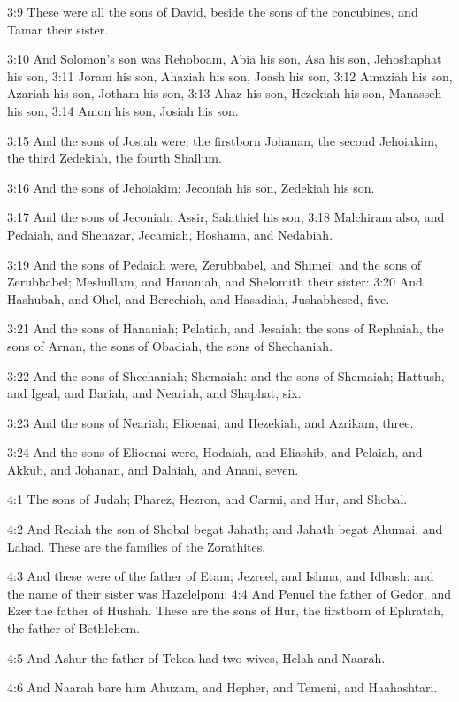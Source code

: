 3:9 These were all the sons of David, beside the sons of the concubines, and Tamar their sister.

3:10 And Solomon's son was Rehoboam, Abia his son, Asa his son, Jehoshaphat his son, 3:11 Joram his son, Ahaziah his son, Joash his son, 3:12 Amaziah his son, Azariah his son, Jotham his son, 3:13 Ahaz his son, Hezekiah his son, Manasseh his son, 3:14 Amon his son, Josiah his son.

3:15 And the sons of Josiah were, the firstborn Johanan, the second Jehoiakim, the third Zedekiah, the fourth Shallum.

3:16 And the sons of Jehoiakim: Jeconiah his son, Zedekiah his son.

3:17 And the sons of Jeconiah; Assir, Salathiel his son, 3:18 Malchiram also, and Pedaiah, and Shenazar, Jecamiah, Hoshama, and Nedabiah.

3:19 And the sons of Pedaiah were, Zerubbabel, and Shimei: and the sons of Zerubbabel; Meshullam, and Hananiah, and Shelomith their sister: 3:20 And Hashubah, and Ohel, and Berechiah, and Hasadiah, Jushabhesed, five.

3:21 And the sons of Hananiah; Pelatiah, and Jesaiah: the sons of Rephaiah, the sons of Arnan, the sons of Obadiah, the sons of Shechaniah.

3:22 And the sons of Shechaniah; Shemaiah: and the sons of Shemaiah; Hattush, and Igeal, and Bariah, and Neariah, and Shaphat, six.

3:23 And the sons of Neariah; Elioenai, and Hezekiah, and Azrikam, three.

3:24 And the sons of Elioenai were, Hodaiah, and Eliashib, and Pelaiah, and Akkub, and Johanan, and Dalaiah, and Anani, seven.

4:1 The sons of Judah; Pharez, Hezron, and Carmi, and Hur, and Shobal.

4:2 And Reaiah the son of Shobal begat Jahath; and Jahath begat Ahumai, and Lahad. These are the families of the Zorathites.

4:3 And these were of the father of Etam; Jezreel, and Ishma, and Idbash: and the name of their sister was Hazelelponi: 4:4 And Penuel the father of Gedor, and Ezer the father of Hushah. These are the sons of Hur, the firstborn of Ephratah, the father of Bethlehem.

4:5 And Ashur the father of Tekoa had two wives, Helah and Naarah.

4:6 And Naarah bare him Ahuzam, and Hepher, and Temeni, and Haahashtari.

